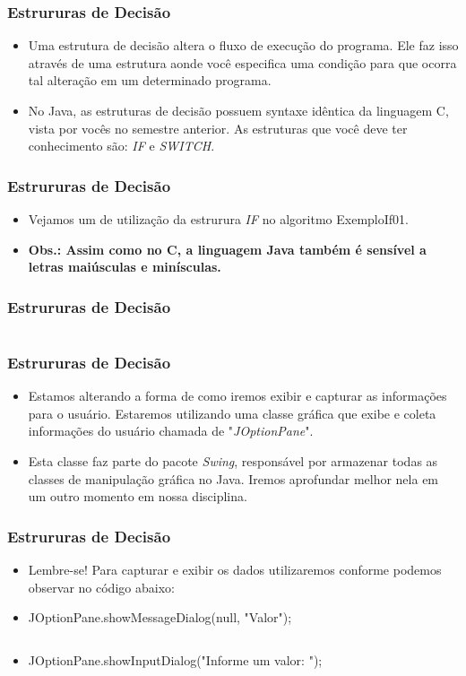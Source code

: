 \documentclass{beamer}
\begin{document}
\begin{frame}
\frametitle{Estrururas de Decisão}
	\begin{itemize}
		\item Uma estrutura de decisão altera o fluxo de execução do programa. Ele faz isso através de uma estrutura aonde você especifica uma condição para que ocorra tal alteração em um determinado programa.
		\item No Java, as estruturas de decisão possuem syntaxe idêntica da linguagem C, vista por vocês no semestre anterior. As estruturas que você deve ter conhecimento são: \textit{IF} e \textit{SWITCH}.
	\end{itemize}
\end{frame}
\begin{frame}
	\frametitle{Estrururas de Decisão}
	\begin{itemize}
		\item Vejamos um de utilização da estrurura \textit{IF} no algoritmo ExemploIf01.
		\item \textbf{Obs.: Assim como no C, a linguagem Java também é sensível a letras maiúsculas e minísculas.}
	\end{itemize}
\end{frame}
\begin{frame}
	\frametitle{Estrururas de Decisão}
	\begin{example}
		\inputminted[tabsize=2, fontsize=\footnotesize]{java}{codigos/ExemploIf01.java}
	\end{example}
\end{frame}
\begin{frame}
	\frametitle{Estrururas de Decisão}
	\begin{itemize}
		\item Estamos alterando a forma de como iremos exibir e capturar as informações para o usuário. Estaremos utilizando uma classe gráfica que exibe e coleta informações do usuário chamada de "\textit{JOptionPane}".
		\item Esta classe faz parte do pacote \textit{Swing}, responsável por armazenar todas as classes de manipulação gráfica no Java. Iremos aprofundar melhor nela em um outro momento em nossa disciplina.
	\end{itemize}
\end{frame}
\begin{frame}
	\frametitle{Estrururas de Decisão}
	\begin{itemize}
		\item Lembre-se! Para capturar e exibir os dados utilizaremos conforme podemos observar no código abaixo:
		\item JOptionPane.showMessageDialog(null, "Valor");
			\begin{itemize}
				\inputminted[tabsize=2, fontsize=\footnotesize]{java}{codigos/ExemploIf02.java}
			\end{itemize}
		\item JOptionPane.showInputDialog("Informe um valor: ");
			\begin{itemize}
				\inputminted[tabsize=2, fontsize=\footnotesize]{java}{codigos/ExemploIf03.java}
			\end{itemize}
	\end{itemize}
\end{frame}
\end{document}

